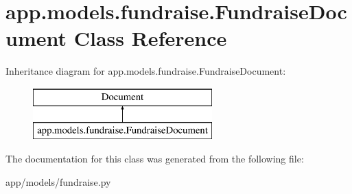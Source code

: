 \hypertarget{classapp_1_1models_1_1fundraise_1_1_fundraise_document}{}\section{app.\+models.\+fundraise.\+Fundraise\+Document Class Reference}
\label{classapp_1_1models_1_1fundraise_1_1_fundraise_document}
Inheritance diagram for app.\+models.\+fundraise.\+Fundraise\+Document\+:\begin{figure}[H]
\begin{center}
\leavevmode
\includegraphics[height=2.000000cm]{classapp_1_1models_1_1fundraise_1_1_fundraise_document}
\end{center}
\end{figure}


The documentation for this class was generated from the following file\+:\begin{DoxyCompactItemize}
\item 
app/models/fundraise.\+py\end{DoxyCompactItemize}

